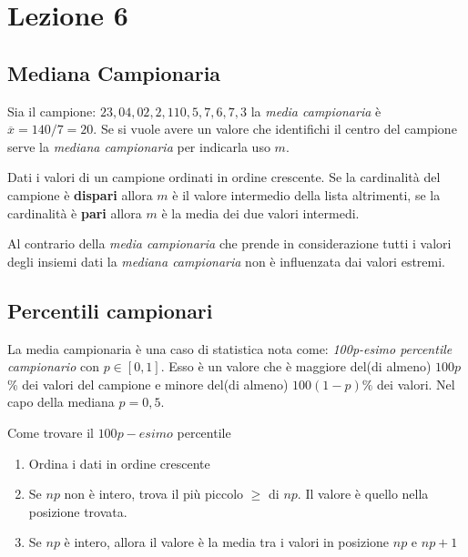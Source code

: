 \documentclass{article}
\begin{document}
\section*{Lezione 6}

\subsection*{Mediana Campionaria}

Sia il campione: $23,04,02,2,110,5,7,6,7,3$ la \textit{media campionaria} è $\overline{x} = 140/7=20$. Se si vuole avere un valore che identifichi il centro del campione serve la \textit{mediana campionaria} per indicarla uso $m$.

\begin{tcolorbox}
 Dati i valori di un campione ordinati in ordine crescente. Se la cardinalità del campione è \textbf{dispari} allora $m$ è il valore intermedio della lista altrimenti, se la cardinalità è \textbf{pari} allora $m$ è la media dei due valori intermedi.  
\end{tcolorbox}

Al contrario della \textit{media campionaria} che prende in considerazione tutti i valori degli insiemi dati la \textit{mediana campionaria} non è influenzata dai valori estremi.

\subsection*{Percentili campionari}

La media campionaria è una caso di statistica nota come: \textit{100p-esimo percentile campionario} con $p \in [0,1]$. Esso è un valore che è maggiore del(di almeno) $100p$\% dei valori del campione e minore del(di almeno) $100(1-p)\%$ dei valori. Nel capo della mediana $p=0,5$.

\begin{tcolorbox}
Come trovare il $100p-esimo$ percentile
  \begin{enumerate}
    \item Ordina i dati in ordine crescente
    \item Se $np$ non è intero, trova il più piccolo $\ge$ di $np$. Il valore è quello nella posizione trovata.
    \item Se $np$ è intero, allora il valore è la media tra i valori in posizione $np$ e $np+1$
  \end{enumerate}  
\end{tcolorbox}
\end{document}
